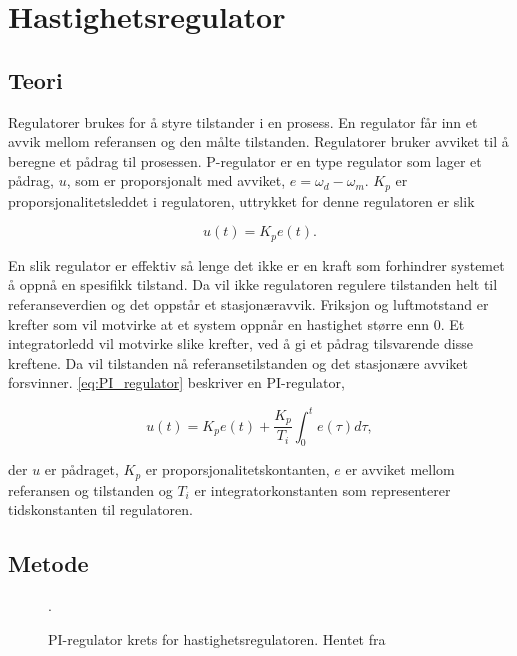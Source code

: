 \section{Hastighetsregulator}\label{sec:hastighetsreg}


\subsection{Teori}

Regulatorer brukes for å styre tilstander i en prosess. En regulator får inn et avvik mellom referansen og den målte tilstanden. Regulatorer bruker avviket til å beregne et pådrag til prosessen. P-regulator er en type regulator som lager et pådrag, $u$,  som er proporsjonalt med avviket, $e = \omega_d - \omega_m$. $K_p$ er proporsjonalitetsleddet i regulatoren, uttrykket for denne regulatoren er slik

\begin{equation}
    \label{eq:P_regulator}
    u(t) = K_p e(t).
\end{equation}

En slik regulator er effektiv så lenge det ikke er en kraft som forhindrer systemet å oppnå en spesifikk tilstand. Da vil ikke regulatoren regulere tilstanden helt til referanseverdien og det oppstår et stasjonæravvik. Friksjon og luftmotstand er krefter som vil motvirke at et system oppnår en hastighet større enn $0$. Et integratorledd vil motvirke slike krefter, ved å gi et pådrag tilsvarende disse kreftene. Da vil tilstanden nå referansetilstanden og det stasjonære avviket forsvinner. \autoref{eq:PI_regulator} beskriver en PI-regulator,

\begin{equation}
    \label{eq:PI_regulator}
    u(t) = K_p e(t) + \frac{K_p}{T_i} \int_{0}^{t} e(\tau) d\tau,
\end{equation}

der $u$ er pådraget, $K_p$ er proporsjonalitetskontanten, $e$ er avviket mellom referansen og tilstanden og $T_i$ er integratorkonstanten som representerer tidskonstanten til regulatoren.







\subsection{Metode}

\begin{figure}[b]
    \centering
    
    \caption{PI-regulator krets for hastighetsregulatoren. Hentet fra \cite{AnalogMotorlabbOppgaver}}.
    \label{fig:krets_hastighets_regulator}
\end{figure}

